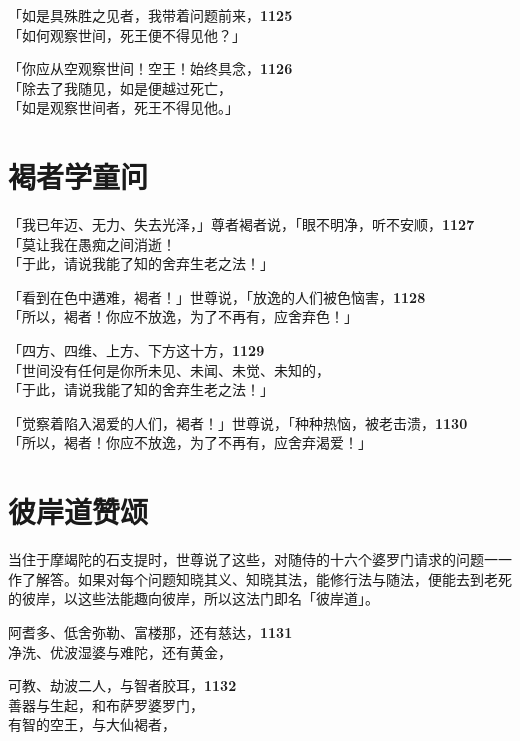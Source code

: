 「如是具殊胜之见者，我带着问题前来，\hfill{\grayfootnotesize \textbf{1125}} \\
「如何观察世间，死王便不得见他？」


「你应从空观察世间！空王！始终具念，\hfill{\grayfootnotesize \textbf{1126}} \\
「除去了我随见，如是便越过死亡，\\
「如是观察世间者，死王不得见他。」


\section{褐者学童问}

「我已年迈、无力、失去光泽，」尊者褐者说，「眼不明净，听不安顺，\hfill{\grayfootnotesize \textbf{1127}} \\
「莫让我在愚痴之间消逝！\\
「于此，请说我能了知的舍弃生老之法！」


「看到在色中遘难，褐者！」世尊说，「放逸的人们被色恼害，\hfill{\grayfootnotesize \textbf{1128}} \\
「所以，褐者！你应不放逸，为了不再有，应舍弃色！」


「四方、四维、上方、下方这十方，\hfill{\grayfootnotesize \textbf{1129}} \\
「世间没有任何是你所未见、未闻、未觉、未知的，\\
「于此，请说我能了知的舍弃生老之法！」


「觉察着陷入渴爱的人们，褐者！」世尊说，「种种热恼，被老击溃，\hfill{\grayfootnotesize \textbf{1130}} \\
「所以，褐者！你应不放逸，为了不再有，应舍弃渴爱！」


\section{彼岸道赞颂}

当住于摩竭陀的石支提时，世尊说了这些，对随侍的十六个婆罗门请求的问题一一作了解答。如果对每个问题知晓其义、知晓其法，能修行法与随法，便能去到老死的彼岸，以这些法能趣向彼岸，所以这法门即名「彼岸道」。


阿耆多、低舍弥勒、富楼那，还有慈达，\hfill{\grayfootnotesize \textbf{1131}} \\
净洗、优波湿婆与难陀，还有黄金，

可教、劫波二人，与智者胶耳，\hfill{\grayfootnotesize \textbf{1132}} \\
善器与生起，和布萨罗婆罗门，\\
有智的空王，与大仙褐者，

